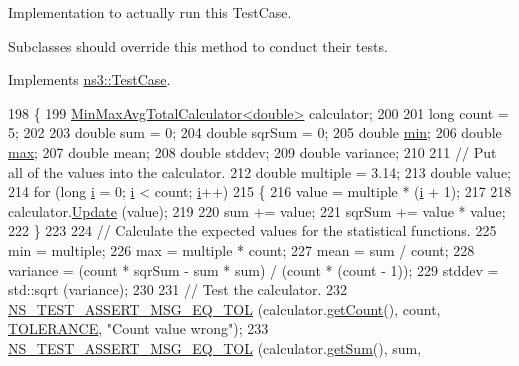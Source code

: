 Implementation to actually run this Test\+Case. 

Subclasses should override this method to conduct their tests. 

Implements \hyperlink{classns3_1_1TestCase_a8ff74680cf017ed42011e4be51917a24}{ns3\+::\+Test\+Case}.


\begin{DoxyCode}
198 \{
199   \hyperlink{classns3_1_1MinMaxAvgTotalCalculator}{MinMaxAvgTotalCalculator<double>} calculator;
200 
201   \textcolor{keywordtype}{long} count = 5;
202 
203   \textcolor{keywordtype}{double} sum = 0;
204   \textcolor{keywordtype}{double} sqrSum = 0;
205   \textcolor{keywordtype}{double} \hyperlink{80211b_8c_ac6afabdc09a49a433ee19d8a9486056d}{min};
206   \textcolor{keywordtype}{double} \hyperlink{80211b_8c_affe776513b24d84b39af8ab0930fef7f}{max};
207   \textcolor{keywordtype}{double} mean;
208   \textcolor{keywordtype}{double} stddev;
209   \textcolor{keywordtype}{double} variance;
210 
211   \textcolor{comment}{// Put all of the values into the calculator.}
212   \textcolor{keywordtype}{double} multiple = 3.14;
213   \textcolor{keywordtype}{double} value;
214   \textcolor{keywordflow}{for} (\textcolor{keywordtype}{long} \hyperlink{bernuolliDistribution_8m_a6f6ccfcf58b31cb6412107d9d5281426}{i} = 0; \hyperlink{bernuolliDistribution_8m_a6f6ccfcf58b31cb6412107d9d5281426}{i} < count; \hyperlink{bernuolliDistribution_8m_a6f6ccfcf58b31cb6412107d9d5281426}{i}++)
215     \{
216       value = multiple * (\hyperlink{bernuolliDistribution_8m_a6f6ccfcf58b31cb6412107d9d5281426}{i} + 1);
217 
218       calculator.\hyperlink{classns3_1_1MinMaxAvgTotalCalculator_acad1745a8441535648ae95c7037a96e1}{Update} (value);
219 
220       sum    += value;
221       sqrSum += value * value;
222     \}
223 
224   \textcolor{comment}{// Calculate the expected values for the statistical functions.}
225   min = multiple;
226   max = multiple * count;
227   mean = sum / count;
228   variance = (count * sqrSum - sum * sum) / (count * (count - 1));
229   stddev = std::sqrt (variance);
230 
231   \textcolor{comment}{// Test the calculator.}
232   \hyperlink{group__testing_ga9e7861b56b4e70db3b56044cb7a28e41}{NS\_TEST\_ASSERT\_MSG\_EQ\_TOL} (calculator.\hyperlink{classns3_1_1MinMaxAvgTotalCalculator_a8f614c4a6a090665a75cea91a68d4486}{getCount}(),    count,    
      \hyperlink{basic-data-calculators-test-suite_8cc_a89311a98397f9d6967d2cb10d5152d77}{TOLERANCE}, \textcolor{stringliteral}{"Count value wrong"});
233   \hyperlink{group__testing_ga9e7861b56b4e70db3b56044cb7a28e41}{NS\_TEST\_ASSERT\_MSG\_EQ\_TOL} (calculator.\hyperlink{classns3_1_1MinMaxAvgTotalCalculator_ae18def40cc95735a4059b8aefb7ba827}{getSum}(),      sum,      

\end{DoxyCode}
